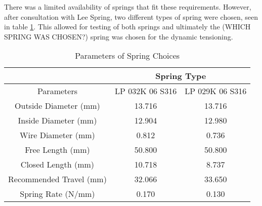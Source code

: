 There was a limited availability of springs that fit these requirements. However, after consultation with Lee Spring, two different types of spring were chosen, seen in table \ref{tab:springparas}. This allowed for testing of both springs and ultimately the (WHICH SPRING WAS CHOSEN?) spring was chosen for the dynamic tensioning. \par
\begin{table}[h]
\centering
\begin{tabular}{|c|c|c|}
\hline
& \multicolumn{2}{|c|}{\textbf{Spring Type}} \\
\hline
Parameters & LP 032K 06 S316 & LP 029K 06 S316 \\
\hline
Outside Diameter (mm) & 13.716 & 13.716 \\
Inside Diameter (mm) & 12.904 & 12.980 \\
Wire Diameter (mm) & 0.812 & 0.736 \\
Free Length (mm) & 50.800 & 50.800 \\
Closed Length (mm) & 10.718 & 8.737 \\
Recommended Travel (mm) & 32.066 & 33.650 \\
Spring Rate (N/mm) & 0.170 & 0.130 \\
\hline
\end{tabular}
\caption{Parameters of Spring Choices}
\label{tab:springparas}
\end{table}
